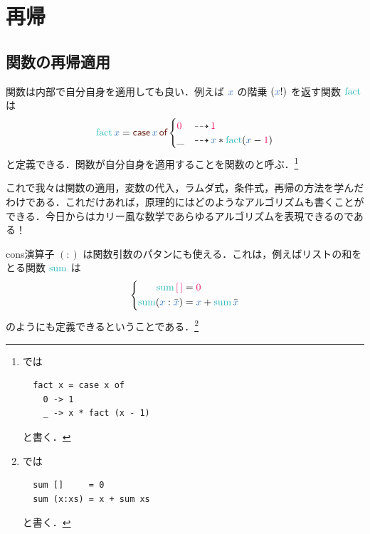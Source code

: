 \documentclass[a5paper,twoside,fleqn,draft]{jsbook}
\begin{document}

\chapter{再帰}
\label{ch:recursion}

\begin{leader}
\end{leader}

\section{関数の再帰適用}

関数は内部で自分自身を適用しても良い．例えば $\hVar{x}$ の階乗 $(\hVar{x}!)$ を返す関数 $\mFact$ は
\begin{equation}
  \mFact\hVar{x}
  =\hCaseSyntax{\hVar{x}}
  \begin{cases}
    \hConstant{0}
    &\hIfSo\hConstant{1}\\
    \_
    &\hIfSo\hVar{x}*\mFact(\hVar{x}-\hConstant{1})
  \end{cases}
\end{equation}
と定義できる．関数が自分自身を適用することを関数のと呼ぶ．\footnote{\haskell では
\begin{verbatim}
  fact x = case x of
    0 -> 1
    _ -> x * fact (x - 1)
\end{verbatim}
と書く．}

これで我々は関数の適用，変数の代入，ラムダ式，条件式，再帰の方法を学んだわけである．これだけあれば，原理的にはどのようなアルゴリズムも書くことができる．今日からはカリー風な数学であらゆるアルゴリズムを表現できるのである！

\separator

cons演算子 $(:)$ は関数引数のパタンにも使える．これは，例えばリストの和をとる関数 $\mSum$ は
\begin{equation}
  \left\{
  \begin{aligned}
    \mSum\mEmptyList
    &=\hConstant{0}\\
    \mSum(\hVar{x}:\hListVarWith{x})
    &=\hVar{x}+\mSum\hListVarWith{x}
  \end{aligned}
  \right.
\end{equation}
のようにも定義できるということである．\footnote{\haskell では
\begin{verbatim}
  sum []     = 0
  sum (x:xs) = x + sum xs
\end{verbatim}
と書く．}
\end{document}
